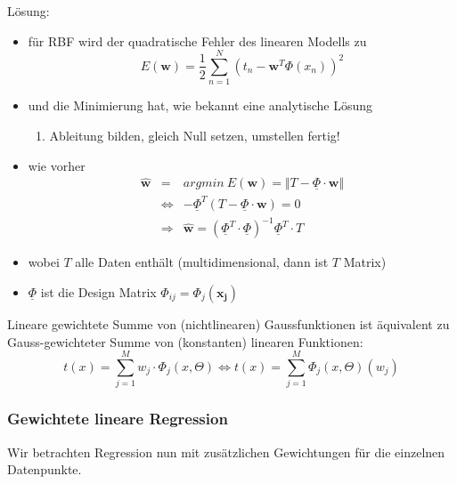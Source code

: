 	Lösung:
	\begin{itemize}
		\item für RBF wird der quadratische Fehler des linearen Modells zu
		\begin{equation*}
			E(\pmb{w}) = \frac{1}{2}\sum_{n=1}^N(t_n-\pmb{w}^T\Phi(x_n))^2
		\end{equation*}
		\item und die Minimierung hat, wie bekannt eine analytische Lösung\vspace*{-3pt}
		\begin{enumerate}[$\hookrightarrow$]
			\item Ableitung bilden, gleich Null setzen, umstellen fertig!
		\end{enumerate}
		\item wie vorher
		\begin{eqnarray*}
			\pmb{\hat{w}} &=& argmin ~E(\pmb{w}) = \Vert T-\underline{\Phi}\cdot \pmb{w}\Vert\\
			&\Leftrightarrow& -\underline{\Phi}^T(T-\underline{\Phi}\cdot\pmb{w}) = 0\\
			&\Rightarrow& \pmb{\hat{w}} = (\underline{\Phi}^T\cdot\underline{\Phi})^{-1}\underline{\Phi}^T\cdot T
		\end{eqnarray*}
		\item wobei $T$ alle Daten enthält (multidimensional, dann ist $T$ Matrix)
		\item $\underline{\Phi}$ ist die Design Matrix $\Phi_{ij} = \Phi_j(\pmb{x_j})$
	\end{itemize}
	Lineare gewichtete Summe von (nichtlinearen) Gaussfunktionen ist äquivalent zu Gauss-gewichteter Summe von (konstanten) linearen Funktionen:
	\begin{equation*}
		t(x) = \sum_{j=1}^M w_j\cdot\Phi_j(x, \Theta) \Leftrightarrow t(x) = \sum_{j=1}^M \Phi_j(x, \Theta)(w_j)
	\end{equation*}
	\subsubsection{Gewichtete lineare Regression}
	Wir betrachten Regression nun mit zusätzlichen Gewichtungen für die einzelnen Datenpunkte.
